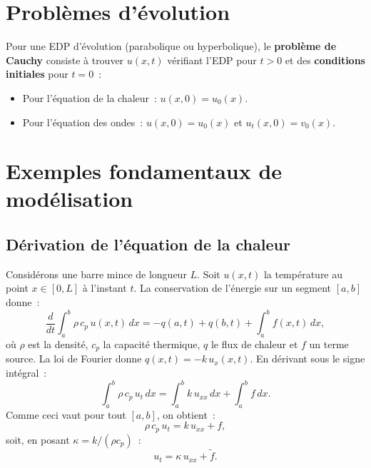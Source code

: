 \section{Probl\`emes d'\'evolution}

\begin{definition}
Pour une EDP d'\'evolution (parabolique ou hyperbolique), le \textbf{probl\`eme
de Cauchy} consiste \`a trouver $u(x,t)$ v\'erifiant l'EDP pour $t > 0$ et
des \textbf{conditions initiales} pour $t = 0$~:
\begin{itemize}
    \item Pour l'\'equation de la chaleur~: $u(x,0) = u_0(x)$.
    \item Pour l'\'equation des ondes~: $u(x,0) = u_0(x)$ et $u_t(x,0) = v_0(x)$.
\end{itemize}
\end{definition}

\begin{center}
\end{center}

\section{Exemples fondamentaux de mod\'elisation}

\subsection{D\'erivation de l'\'equation de la chaleur}

Consid\'erons une barre mince de longueur $L$. Soit $u(x,t)$ la temp\'erature
au point $x \in [0,L]$ \`a l'instant $t$. La conservation de l'\'energie sur
un segment $[a,b]$ donne~:
\[
    \frac{d}{dt}\int_a^b \rho\, c_p\, u(x,t)\,dx
    = -q(a,t) + q(b,t) + \int_a^b f(x,t)\,dx,
\]
o\`u $\rho$ est la densit\'e, $c_p$ la capacit\'e thermique, $q$ le flux
de chaleur et $f$ un terme source. La loi de Fourier donne
$q(x,t) = -k\, u_x(x,t)$. En d\'erivant sous le signe int\'egral~:
\[
    \int_a^b \rho\, c_p\, u_t\, dx = \int_a^b k\, u_{xx}\, dx
    + \int_a^b f\, dx.
\]
Comme ceci vaut pour tout $[a,b]$, on obtient~:
\[
    \rho\, c_p\, u_t = k\, u_{xx} + f,
\]
soit, en posant $\kappa = k/(\rho c_p)$~:
\begin{equation}\label{eq:chaleur_derivation}
    u_t = \kappa\, u_{xx} + \tilde{f}.
\end{equation}

